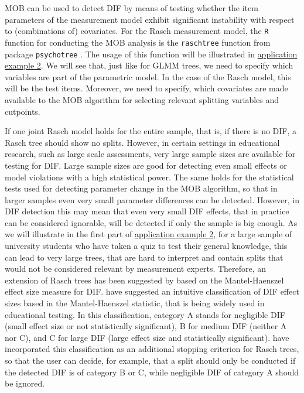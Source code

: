 \documentclass[doc,floatsintext,natbib]{apa7}
\begin{document}
MOB can be used to detect DIF by means of testing whether the item parameters of the measurement model exhibit significant instability with respect to (combinations of) covariates. For the Rasch measurement model, the \texttt{R} function for conducting the MOB analysis is the \texttt{raschtree} function from package \texttt{psychotree} \citep{StroyKopf15}. The usage of this function will be illustrated in \hyperref[sec:TutorialRasch]{application example 2}. We will see that, just like for GLMM trees, we need to specify which variables are part of the parametric model. In the case of the Rasch model, this will be the test items. Moreover, we need to specify, which covariates are made available to the MOB algorithm for selecting relevant splitting variables and cutpoints. 

If one joint Rasch model holds for the entire sample, that is, if there is no DIF, a Rasch tree should show no splits. However, in certain settings in educational research, such as large scale assessments, very large sample sizes are available for testing for DIF. Large sample sizes are good for detecting even small effects or model violations with a high statistical power. The same holds for the statistical tests used for detecting parameter change in the MOB algorithm, so that in larger samples even very small parameter differences can be detected. However, in DIF detection this may mean that even very small DIF effects, that in practice can be considered ignorable, will be detected if only the sample is big enough. As we will illustrate in the first part of \hyperref[sec:TutorialRasch]{application example 2}, for a large sample of university students who have taken a quiz to test their general knowledge, this can lead to very large trees, that are hard to interpret and contain splits that would not be considered relevant by measurement experts. Therefore, an extension of Rasch trees has been suggested by \citet{HenDebStr:2023:EPM} based on the Mantel-Haenszel effect size measure for DIF. \citet{HolTha:1985} have suggested an intuitive classification of DIF effect sizes based in the Mantel-Haenszel statistic, that is being widely used in educational testing. In this classification, category A stands for negligible DIF (small effect size or not statistically significant), B for medium DIF (neither A nor C), and C for large DIF (large effect size and statistically significant). \citet{HenDebStr:2023:EPM} have incorporated this classification as an additional stopping criterion for Rasch trees, so that the user can decide, for example, that a split should only be conducted if the detected DIF is of category B or C, while negligible DIF of category A should be ignored. 
\end{document}
